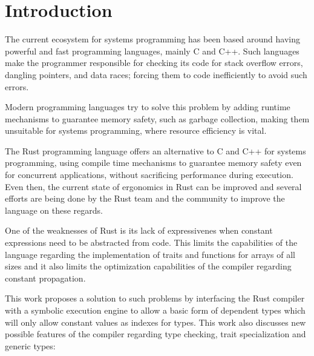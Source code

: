 \chapter{Introduction}
\label{chap:introduction}
The current ecosystem for systems programming has been based around having
powerful and fast programming languages, mainly C and C++. Such languages make
the programmer responsible for  checking its code for stack overflow errors,
dangling pointers, and data races; forcing them to code inefficiently to avoid
such errors.

Modern programming languages try to solve this problem by adding runtime
mechanisms to guarantee memory safety, such as garbage collection, making them
unsuitable for systems programming, where resource efficiency is vital.

The Rust programming language offers an alternative to C and C++ for systems
programming, using compile time mechanisms to guarantee memory safety even for
concurrent applications, without sacrificing performance during execution. \\
Even then, the current state of ergonomics in Rust can be improved and several
efforts are being done by the Rust team and the community to improve the
language on these regards.

One of the weaknesses of Rust  is its lack of expressivenes when constant
expressions need to be abstracted from code. This limits the capabilities of
the language regarding the implementation of traits and functions for arrays of
all sizes and it also limits the optimization capabilities of the compiler
regarding constant propagation.

This work proposes a solution to such problems by interfacing the Rust compiler
with a symbolic execution engine to allow a basic form of dependent types which
will only allow constant values as indexes for types. This work also discusses
new possible features of the compiler regarding type checking, trait
specialization and generic types:


